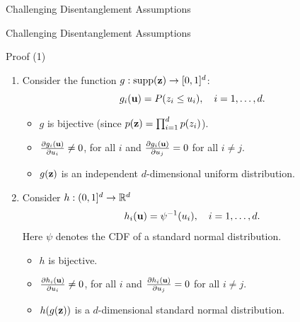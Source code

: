 \begin{frame}{Challenging Disentanglement Assumptions}
\end{frame}
\begin{frame}{Challenging Disentanglement Assumptions}
\begin{block}{Proof (1)}
	\begin{enumerate}
		\item 
		Consider the function $g: \text{supp}(\mathbf{z}) \rightarrow [0, 1]^d$:
		\vspace{-0.1cm}
		\[
		g_i(\mathbf{u}) = P(z_i \leq u_i), \quad i=1, \dots, d.
		\]
		\vspace{-0.4cm}
		\begin{itemize}
			\item $g$ is bijective (since $p(\mathbf{z}) = \prod_{i=1}^dp(z_i)$).
			\item $\frac{\partial g_i(\mathbf{u})}{\partial u_i} \neq 0$, for all $i$ and $\frac{\partial g_i(\mathbf{u})}{\partial u_j} = 0$ for all $i \neq j$.
			\item $g(\mathbf{z})$ is an independent $d$-dimensional uniform distribution.
		\end{itemize}
		\item 
		Consider $h: (0, 1]^d \rightarrow \mathbb{R}^d$
		\[
		h_i(\mathbf{u}) = \psi^{-1}(u_i), \quad i= 1, \dots, d.
		\]
		Here $\psi$  denotes the CDF of a standard normal distribution.
		\begin{itemize}
			\item $h$ is bijective.
			\item $\frac{\partial h_i(\mathbf{u})}{\partial u_i} \neq 0$, for all $i$ and $\frac{\partial h_i(\mathbf{u})}{\partial u_j} = 0$ for all $i \neq j$.
			\item $h(g(\mathbf{z}))$  is a $d$-dimensional standard normal distribution.
		\end{itemize}
	\end{enumerate}
\end{block}

\end{frame}
